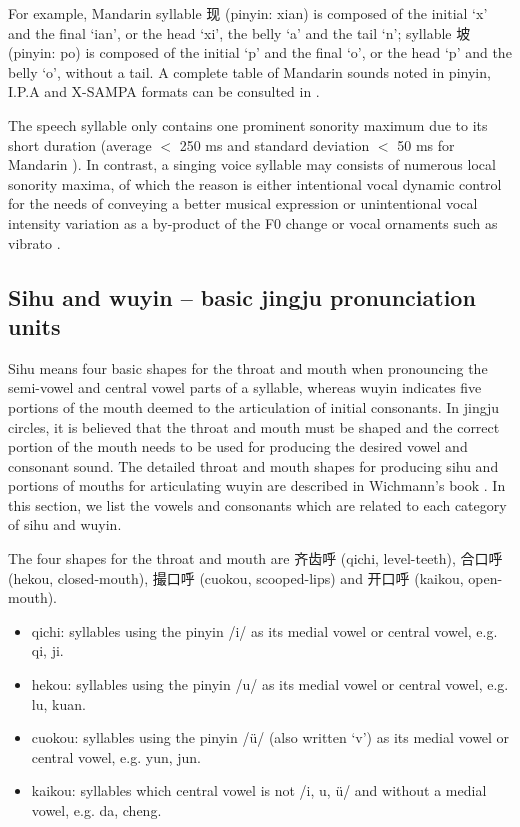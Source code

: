 For example, Mandarin syllable 现 (pinyin: xian) is composed of the initial `x' and the final `ian', or the head `xi', the belly `a' and the tail `n'; syllable 坡 (pinyin: po) is composed of the initial `p' and the final `o', or the head `p' and the belly `o', without a tail. A complete table of Mandarin sounds noted in pinyin, I.P.A and X-SAMPA formats can be consulted in .

The speech syllable only contains one prominent sonority maximum due to its short duration (average $<$ 250 ms and standard deviation $<$ 50 ms for Mandarin \cite{wang_syllable_1994}). In contrast, a singing voice syllable may consists of numerous local sonority maxima, of which the reason is either intentional vocal dynamic control for the needs of conveying a better musical expression or unintentional vocal intensity variation as a by-product of the F0 change \cite{titze_vocal_1992} or vocal ornaments such as vibrato \cite{horii_note_1988}.

\subsection{Sihu and wuyin -- basic jingju pronunciation units}\label{sec:ch2:sihu_wuyin}

Sihu means four basic shapes for the throat and mouth when pronouncing the semi-vowel and central vowel parts of a syllable, whereas wuyin indicates five portions of the mouth deemed to the articulation of initial consonants. In jingju circles, it is believed that the throat and mouth must be shaped and the correct portion of the mouth needs to be used for producing the desired vowel and consonant sound. The detailed throat and mouth shapes for producing sihu and portions of mouths for articulating wuyin are described in Wichmann's book \cite{Wichmann1991a}. In this section, we list the vowels and consonants which are related to each category of sihu and wuyin.

The four shapes for the throat and mouth are 齐齿呼 (qichi, level-teeth), 合口呼 (hekou, closed-mouth), 撮口呼 (cuokou, scooped-lips) and 开口呼 (kaikou, open-mouth). 
\begin{itemize}
\item qichi: syllables using the pinyin /i/ as its medial vowel or central vowel, e.g. qi, ji.
\item hekou: syllables using the pinyin /u/ as its medial vowel or central vowel, e.g. lu, kuan.
\item cuokou: syllables using the pinyin /ü/ (also written `v') as its medial vowel or central vowel, e.g. yun, jun.
\item kaikou: syllables which central vowel is not /i, u, ü/ and without a medial vowel, e.g. da, cheng.
\end{itemize}

